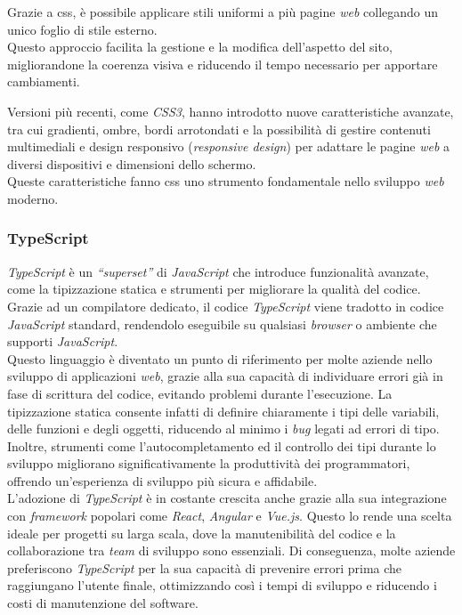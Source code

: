 \noindent Grazie a \gls{css}, è possibile applicare stili uniformi a più pagine \textit{web} collegando un unico foglio di stile esterno.\\
Questo approccio facilita la gestione e la modifica dell’aspetto del sito, migliorandone la coerenza visiva e riducendo il tempo necessario per apportare cambiamenti.

\noindent Versioni più recenti, come \textit{CSS3}, hanno introdotto nuove caratteristiche avanzate, tra cui gradienti, ombre, bordi arrotondati e la possibilità di gestire contenuti multimediali
 e design responsivo (\textit{responsive design}) per adattare le pagine \textit{web} a diversi dispositivi e dimensioni dello schermo. \\
Queste caratteristiche fanno \gls{css} uno strumento fondamentale nello sviluppo \textit{web} moderno.

\pagebreak
\subsubsection{TypeScript}

\textit{TypeScript} è un \textit{“superset”} di \textit{JavaScript} che introduce funzionalità avanzate, come la tipizzazione statica e strumenti per migliorare la qualità del codice.\\
Grazie ad un compilatore dedicato, il codice \textit{TypeScript} viene tradotto in codice \textit{JavaScript} standard, rendendolo eseguibile su qualsiasi \textit{browser} o ambiente che supporti \textit{JavaScript}.\\

\noindent Questo linguaggio è diventato un punto di riferimento per molte aziende nello sviluppo di applicazioni \textit{web}, grazie alla sua capacità di individuare errori già in fase di scrittura del codice, evitando problemi durante l'esecuzione. 
La tipizzazione statica consente infatti di definire chiaramente i tipi delle variabili, delle funzioni e degli oggetti, riducendo al minimo i \textit{bug} legati ad errori di tipo. \\
Inoltre, strumenti come l’autocompletamento ed il controllo dei tipi durante lo sviluppo migliorano significativamente la produttività dei programmatori, offrendo un’esperienza di sviluppo più sicura e affidabile.\\

\noindent L’adozione di \textit{TypeScript} è in costante crescita anche grazie alla sua integrazione con \textit{framework} popolari come \textit{React}, \textit{Angular} e \textit{Vue.js}. 
Questo lo rende una scelta ideale per progetti su larga scala, dove la manutenibilità del codice e la collaborazione tra \textit{team} di sviluppo sono essenziali.
Di conseguenza, molte aziende preferiscono \textit{TypeScript} per la sua capacità di prevenire errori prima che raggiungano l'utente finale, ottimizzando così i tempi di sviluppo e riducendo i costi di manutenzione del software.\\

